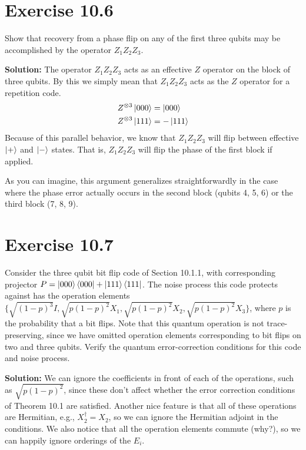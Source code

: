\documentclass{book}
\begin{document}
\section*{Exercise 10.6}
    Show that recovery from a phase flip on any of the first three qubits may be accomplished by the operator $Z_1 Z_2 Z_3$.
    
    \textbf{Solution:} The operator $Z_1 Z_2 Z_3$ acts as an effective $Z$ operator on the block of three qubits. By this we simply mean that $Z_1 Z_2 Z_3$ acts as the $Z$ operator for a repetition code.
    \begin{align}
    \begin{aligned}
        Z^{\otimes{3}} \ket{000} &= \ket{000} \\
        Z^{\otimes{3}} \ket{111} &= - \ket{111}
    \end{aligned}
    \end{align}
    Because of this parallel behavior, we know that $Z_1 Z_2 Z_3$ will flip between effective $\ket{+}$ and $\ket{-}$ states. That is, $Z_1 Z_2 Z_3$ will flip the phase of the first block if applied.

    As you can imagine, this argument generalizes straightforwardly in the case where the phase error actually occurs in the second block (qubits 4, 5, 6) or the third block (7, 8, 9). 

\section*{Exercise 10.7}
    Consider the three qubit bit flip code of Section 10.1.1, with corresponding projector $P = \ket{000}\bra{000} + \ket{111}\bra{111}$. The noise process this code protects against has the operation elements \linebreak
    $\{\sqrt{(1-p)^3}I, \sqrt{p(1-p)^2} X_1, \sqrt{p(1-p)^2} X_2, \sqrt{p(1-p)^2} X_3\}$, where $p$ is the probability that a bit flips. Note that this quantum operation is not trace-preserving, since we have omitted operation elements corresponding to bit flips on two and three qubits. Verify the quantum error-correction conditions for this code and noise process.

    \textbf{Solution:} We can ignore the coefficients in front of each of the operations, such as $\sqrt{p(1-p)^2}$, since these don't affect whether the error correction conditions of Theorem 10.1 are satisfied. Another nice feature is that all of these operations are Hermitian, e.g., $X_2^\dagger = X_2$, so we can ignore the Hermitian adjoint in the conditions. We also notice that all the operation elements commute (why?), so we can happily ignore orderings of the $E_i$.
\end{document}
